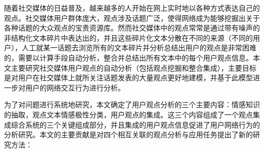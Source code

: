 \begin{cabstract}
随着社交媒体的日益普及，越来越多的人开始在网上实时地以各种方式表达自己的观点。社交媒体用户群体庞大，观点涉及话题广泛，使得网络成为能够挖掘出关于各种话题的大众观点的宝贵资源库。然而社交媒体中的观点常常是通过带有噪声的非结构化文本碎片中表达出的，并且这些碎片化文本分散在不同的来源（不同的用户），人工就某一话题去浏览所有的文本碎片并分析总结出用户的观点是非常困难的，需要以计算手段自动分析，整合并总结出所有文本中的每个用户观点信息。本文主要研究社交媒体用户观点的自动分析（包括观点挖掘和整合集成），主要目标是对用户在社交媒体上就所关注话题发表的大量观点更好地建模，并基于此模型进一步对用户的网络交互行为进行分析。

为了对问题进行系统地研究，本文确定了用户观点分析的三个主要内容：情感知识的抽取，观点文本情感极性分类，用户观点的集成。这三个内容组成了一个观点集成综合系统的三个关键组成部分，并且集成的用户观点信息促进了用户网络行为的分析研究。本文的主要贡献是对四个相互关联的观点分析与应用任务提出了新的研究方法：


\end{cabstract}
